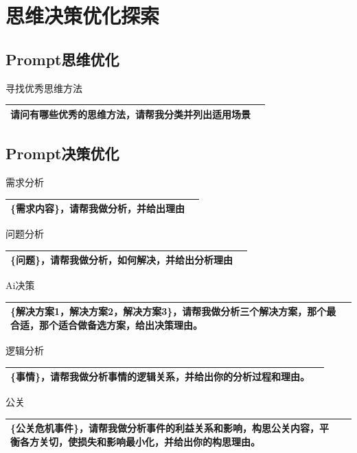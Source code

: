 \documentclass[12pt]{book}
\begin{document}
\section{思维决策优化探索}

\subsection{Prompt思维优化}
\bigskip
寻找优秀思维方法

\begin{tabular}{|p{15cm}|p{3cm}|}
	\hline
请问有哪些优秀的思维方法，请帮我分类并列出适用场景\\
	\hline
\end{tabular}

\subsection{Prompt决策优化}
\bigskip
需求分析

\begin{tabular}{|p{15cm}|p{3cm}|}
	\hline
\{需求内容\}，请帮我做分析，并给出理由\\
	\hline
\end{tabular}


\bigskip
问题分析

\begin{tabular}{|p{15cm}|p{3cm}|}
	\hline
\{问题\}，请帮我做分析，如何解决，并给出分析理由\\
	\hline
\end{tabular}


\bigskip
Ai决策

\begin{tabular}{|p{15cm}|p{3cm}|}
	\hline
\{解决方案1，解决方案2，解决方案3\}，请帮我做分析三个解决方案，那个最合适，那个适合做备选方案，给出决策理由。\\
	\hline
\end{tabular}



\bigskip
逻辑分析

\begin{tabular}{|p{15cm}|p{3cm}|}
	\hline
\{事情\}，请帮我做分析事情的逻辑关系，并给出你的分析过程和理由。\\
	\hline
\end{tabular}


\bigskip
公关

\begin{tabular}{|p{15cm}|p{3cm}|}
	\hline
\{公关危机事件\}，请帮我做分析事件的利益关系和影响，构思公关内容，平衡各方关切，使损失和影响最小化，并给出你的构思理由。\\
	\hline
\end{tabular}
\end{document}
